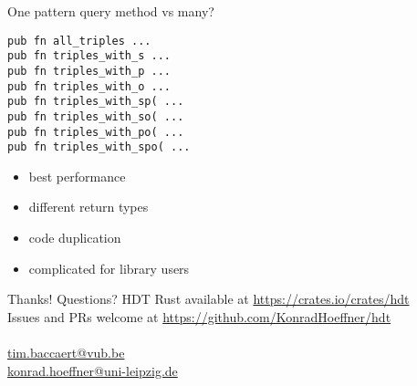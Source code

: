 \documentclass[14pt,aspectratio=169]{beamer}
\newcommand\pro{\item[$+$]}
\newcommand\con{\item[$-$]}
\begin{document}
\begin{frame}[fragile]{One pattern query method vs many?}
\footnotesize
\begin{verbatim}
pub fn all_triples ...
pub fn triples_with_s ...
pub fn triples_with_p ...
pub fn triples_with_o ...
pub fn triples_with_sp( ...
pub fn triples_with_so( ...
pub fn triples_with_po( ...
pub fn triples_with_spo( ...
\end{verbatim}
\begin{itemize}
\pro best performance
\con different return types
\con code duplication
\con complicated for library users
\end{itemize}
\end{frame}

\iffalse
\begin{frame}{Conclusions}
\begin{itemize}
\item Rust great fit for stable and performant Semantic Web tooling
\end{itemize}
\end{frame}
\fi

\begin{frame}[fragile]{Thanks! Questions?}
\centering
HDT Rust available at \url{https://crates.io/crates/hdt}\\
Issues and PRs welcome at \url{https://github.com/KonradHoeffner/hdt}\\
~\\
\url{tim.baccaert@vub.be}\\
\url{konrad.hoeffner@uni-leipzig.de}\\
\end{frame}
\end{document}
